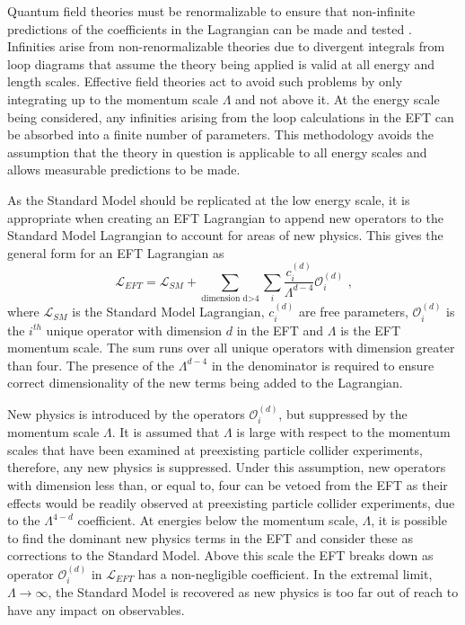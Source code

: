Quantum field theories must be renormalizable to ensure that non-infinite predictions of the coefficients in the Lagrangian can be made and tested \cite{Gripaios:2015qya}.  Infinities arise from non-renormalizable theories due to divergent integrals from loop diagrams that assume the theory being applied is valid at all energy and length scales.  Effective field theories act to avoid such problems by only integrating up to the momentum scale $\Lambda$ and not above it.  At the energy scale being considered, any infinities arising from the loop calculations in the EFT can be absorbed into a finite number of parameters.  This methodology avoids the assumption that the theory in question is applicable to all energy scales and allows measurable predictions to be made.  

As the Standard Model should be replicated at the low energy scale, it is appropriate when creating an EFT Lagrangian to append new operators to the Standard Model Lagrangian to account for areas of new physics.  This gives the general form for an EFT Lagrangian as \cite{Degrande:2013rea}
%
\begin{equation}
\mathcal{L}_{EFT} = \mathcal{L}_{SM} + \sum_{\text{dimension d>4}} \sum_{i} \frac{c_{i}^{(d)}}{\Lambda^{d-4}} \mathcal{O}_{i}^{(d)} \text{ ,}
\label{equ:eft}
\end{equation}
%
\noindent where $\mathcal{L}_{SM}$ is the Standard Model Lagrangian, $c_{i}^{(d)}$ are free parameters, $\mathcal{O}_{i}^{(d)}$ is the $i^{th}$ unique operator with dimension $d$ in the EFT and $\Lambda$ is the EFT momentum scale.  The sum runs over all unique operators with dimension greater than four.  The presence of the $\Lambda^{d-4}$ in the denominator is required to ensure correct dimensionality of the new terms being added to the Lagrangian.  

New physics is introduced by the operators $\mathcal{O}_{i}^{(d)}$, but suppressed by the momentum scale $\Lambda$.  It is assumed that $\Lambda$ is large with respect to the momentum scales that have been examined at preexisting particle collider experiments, therefore, any new physics is suppressed.  Under this assumption, new operators with dimension less than, or equal to, four can be vetoed from the EFT as their effects would be readily observed at preexisting particle collider experiments, due to the $\Lambda^{4-d}$ coefficient.  At energies below the momentum scale, $\Lambda$, it is possible to find the dominant new physics terms in the EFT and consider these as corrections to the Standard Model.  Above this scale the EFT breaks down as operator $\mathcal{O}_{i}^{(d)}$ in $\mathcal{L}_{EFT}$ has a non-negligible coefficient.  In the extremal limit, $\Lambda \rightarrow \infty$, the Standard Model is recovered as new physics is too far out of reach to have any impact on observables.

